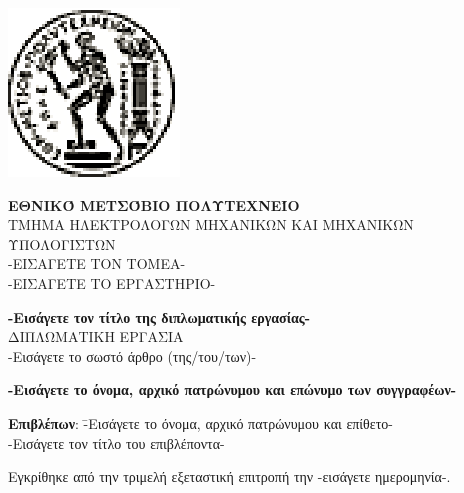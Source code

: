 \documentclass[12pt, twoside, a4paper]{report}
\begin{document}
\newpage
\thispagestyle{empty}
\hspace{10pt}
\newpage
\thispagestyle{empty}
\includegraphics[scale=1.1]{figures/pyrforos.eps}
\noindent
\parbox[b]{0.7\textwidth} {\textbf{
\noindent
\normalsize{ΕΘΝΙΚΌ}
\normalsize{ΜΕΤΣΌΒΙΟ}
\normalsize{ΠΟΛΥΤΕΧΝΕΊΟ}} \\
\small
TMHMA
ΗΛΕΚΤΡΟΛΟΓΩΝ
ΜΗΧΑΝΙΚΩΝ
ΚΑΙ
ΜΗΧΑΝΙΚΩΝ
ΥΠΟΛΟΓΙΣΤΩΝ \\
-ΕΙΣΑΓΕΤΕ ΤΟΝ ΤΟΜΕΑ- \\
-ΕΙΣΑΓΕΤΕ ΤΟ ΕΡΓΑΣΤΗΡΙΟ- \\
}

\begin{center}
\vspace{7ex}
\large \textbf{-Εισάγετε τον τίτλο της διπλωματικής εργασίας-} \\
\vspace{8ex}
\large
ΔΙΠΛΩΜΑΤΙΚΗ ΕΡΓΑΣΙΑ\\
\vspace{2ex}
\normalsize
-Εισάγετε το σωστό άρθρο (της/του/των)- \\
\vspace{2ex}
\parbox[c]{0.4\textwidth} { \center\textbf{
-Εισάγετε το όνομα, αρχικό πατρώνυμου και επώνυμο των συγγραφέων- }}
\vspace{10ex}
\begin{tabbing}
	\textbf{Επιβλέπων}: \= -Εισάγετε το όνομα, αρχικό πατρώνυμου
				και επίθετο- \\
			    \> -Εισάγετε τον τίτλο του επιβλέποντα-
\end{tabbing}
\end{center}

\noindent
Εγκρίθηκε από την τριμελή εξεταστική επιτροπή την -εισάγετε ημερομηνία-.
\end{document}

